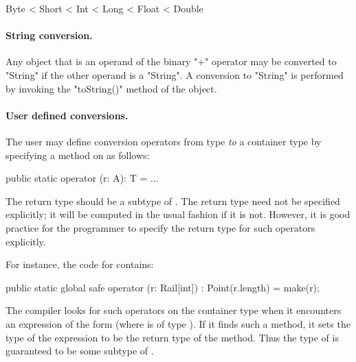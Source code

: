 \begin{xten}
Byte < Short < Int < Long < Float < Double
\end{xten}


\paragraph{String conversion.}
Any object that is an operand of the binary
\xcd"+" operator may
be converted to \xcd"String" if the other operand is a \xcd"String".
A conversion to \xcd"String" is performed by invoking the \xcd"toString()"
method of the object.


\paragraph{User defined conversions.}\label{sec:user-defined-conversions}

The user may define conversion operators from type  {\em to} a
container type  by specifying a method on  as follows:

\begin{xten}
  public static operator (r: A): T = ... 
\end{xten}

The return type  should be a subtype of . The return
type need not be specified explicitly; it will be computed in the
usual fashion if it is not. However, it is good practice for the
programmer to specify the return type for such operators explicitly.

For instance, the code for  contains:

\begin{xten}
  public static global safe operator (r: Rail[int])
     : Point(r.length) = make(r);
\end{xten}

The compiler looks for such operators on the container type 
when it encounters an expression of the form  (where
 is of type ). If it finds such a method, it sets the
type of the expression  to be the return type of the
method. Thus the type of  is guaranteed to be some subtype
of .

